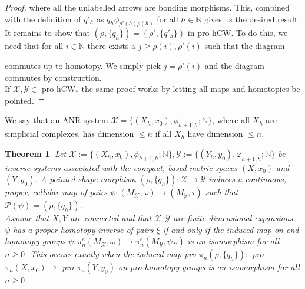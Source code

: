\documentclass[a4paper,11pt]{article}
\theoremstyle{definition}
\theoremstyle{plain}
\newtheorem{theorem}[definition]{Theorem}
\theoremstyle{remark}
\begin{document}
{\begin{proof}
 
 where all the unlabelled arrows are bonding morphisms. This, combined with the definition of $q'_{h}$ as $q_{h}\phi_{\rho'(h)\rho(h)}$ for all $h\in \mathbb{N}$ gives us the desired result. \\
 
It remains to show that $(\rho,\{q_{h}\}) =(\rho',\{q'_{h}\})$ in pro-hCW. To do this, we need that for all $i\in \mathbb{N}$ there exists a $j\geq \rho(i), \rho'(i)$ such that the diagram

\begin{figure}[H]
\center
{}
 \end{figure}
 
 commutes up to homotopy. We simply pick $j=\rho'(i)$ and the diagram commutes by construction. \\

If $\mathcal{X},\mathcal{Y}\in$ pro-hCW$_{\ast}$ the same proof works by letting all maps and homotopies be pointed. 
\end{proof}

We say that an ANR-system $\mathcal{X} = \{(X_{h},x_0), \phi_{h+1,h}; \mathbb{N}\}$, where all $X_{h}$ are simplicial complexes, has dimension $\leq n $ if all $X_{h}$ have dimension $\leq n$.


\begin{theorem} \label{wseimplieswphe1} Let $\mathcal{X}:=\{(X_{h},x_0), \phi_{h+1,h}; \mathbb{N}\},\mathcal{Y}:=\{(Y_{h}, y_0), \varphi_{h+1,h}; \mathbb{N}\}$ be inverse systems associated with the compact, based metric spaces $(X,x_{0})$ and $(Y,y_{0})$. A pointed shape morphism $(\rho,\{q_{h}\}): \mathcal{X}\rightarrow \mathcal{Y}$ induces a continuous, proper, cellular map of pairs $\psi: (M_{\mathcal{X}}, \omega)\rightarrow (M_{\mathcal{Y}}, \tau)$ such that $\mathcal{P}(\psi)= (\rho,\{q_{h}\})$.\\

Assume that $X,Y$ are connected and that $\mathcal{X},\mathcal{Y}$ are finite-dimensional expansions. $\psi$ has a proper homotopy inverse of pairs $\xi$ if and only if the induced map on end homotopy groups $\psi: \pi_{n}^{e}(M_{\mathcal{X}},\omega)\rightarrow \pi_{n}^{e}(M_{\mathcal{Y}}, \psi \omega)$ is an isomorphism for all $n\geq 0$. This occurs exactly when the induced map pro-$\pi_{n}(\rho,\{q_{h}\}):$ pro-$\pi_{n}(X,x_0)\rightarrow$ pro-$\pi_{n}(Y,y_0)$ on pro-homotopy groups is an isomorphism for all $n\geq 0$. 
\end{theorem}

}
\end{document}
